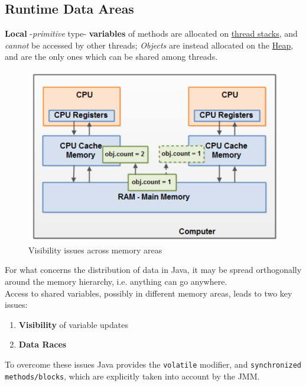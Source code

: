 \subsection{Runtime Data Areas}
\textbf{Local} {-}\textit{primitive} type{-} \textbf{variables} of methods are allocated on \ul{thread stacks},
and \textit{cannot} be accessed by other threads;
\textit{Objects} are instead allocated on the \ul{Heap}, and are the only ones which can be shared among threads.

\newpage
\begin{paracol}{2}

   \begin{figure}[htbp]
      \centering
      \includegraphics{images/jmm_visibility.png}
      \caption{Visibility issues across memory areas}
      \label{fig:jmm_visibility}
   \end{figure}

   
\end{paracol}
For what concerns the distribution of data in Java,
it may be spread orthogonally around the memory hierarchy, 
i.e. anything can go anywhere.\\
Access to shared variables, possibly in different memory areas,
leads to two key issues:
\begin{enumerate}
   \item \textbf{Visibility} of variable updates
   \item \textbf{Data Races}
\end{enumerate}
To overcome these issues Java provides the \lstinline|volatile| modifier, and \lstinline|synchronized methods/blocks|, which are explicitly taken into account by the JMM.


